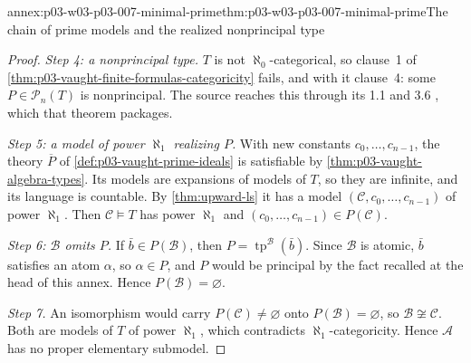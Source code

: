 \begin{annexitem}{annex:p03-w03-p03-007-minimal-prime}{thm:p03-w03-p03-007-minimal-prime}{The chain of prime models and the realized nonprincipal type}
\begin{proof}
\emph{Step 4: a nonprincipal type.} \(T\) is not \(\aleph_0\)-categorical,
so clause~1 of \cref{thm:p03-vaught-finite-formulas-categoricity} fails, and
with it clause~4: some \(P\in\mathcal P_n(T)\) is nonprincipal. The source
reaches this through its 1.1 and 3.6
\cite[p.~316]{Vaught1961}, which that theorem packages.

\emph{Step 5: a model of power \(\aleph_1\) realizing \(P\).} With new
constants \(c_0,\ldots,c_{n-1}\), the theory \(\overline P\) of
\cref{def:p03-vaught-prime-ideals} is satisfiable by
\cref{thm:p03-vaught-algebra-types}. Its models are expansions of models of
\(T\), so they are infinite, and its language is countable. By
\cref{thm:upward-ls} it has a model \((\mathcal C,c_0,\ldots,c_{n-1})\) of
power \(\aleph_1\). Then \(\mathcal C\models T\) has power \(\aleph_1\) and
\((c_0,\ldots,c_{n-1})\in P(\mathcal C)\).

\emph{Step 6: \(\mathcal B\) omits \(P\).} If \(\bar b\in P(\mathcal B)\),
then \(P=\operatorname{tp}^{\mathcal B}(\bar b)\). Since \(\mathcal B\) is
atomic, \(\bar b\) satisfies an atom \(\alpha\), so \(\alpha\in P\), and \(P\)
would be principal by the fact recalled at the head of this annex. Hence
\(P(\mathcal B)=\varnothing\).

\emph{Step 7.} An isomorphism would carry \(P(\mathcal C)\neq\varnothing\)
onto \(P(\mathcal B)=\varnothing\), so \(\mathcal B\not\cong\mathcal C\).
Both are models of \(T\) of power \(\aleph_1\), which contradicts
\(\aleph_1\)-categoricity. Hence \(\mathcal A\) has no proper elementary
submodel.
\end{proof}
\end{annexitem}

